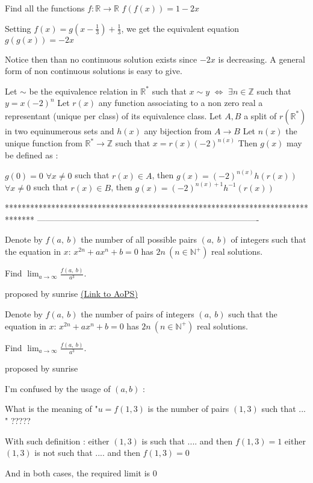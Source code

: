 \begin{solution}
	\begin{tcolorbox}Find all the functions $ f:\mathbb{R}\rightarrow\mathbb{R} $
$ f(f(x)) = 1-2x $\end{tcolorbox}
Setting $f(x)=g(x-\frac 13)+\frac 13$, we get the equivalent equation $g(g(x))=-2x$

Notice then than no continuous solution exists since $-2x$ is decreasing.
A general form of non continuous solutions is easy to give.

Let $\sim$ be the equivalence relation in $\mathbb R^*$ such that $x\sim y$ $\iff$ $\exists n\in\mathbb Z$ such that $y=x(-2)^n$
Let $r(x)$ any function associating to a non zero real a representant (unique per class) of its equivalence class.
Let $A,B$ a split of $r(\mathbb R^*)$ in two equinumerous sets and $h(x)$ any bijection from $A\to B$
Let $n(x)$ the unique function from $\mathbb R^*\to \mathbb Z$ such that $x=r(x)(-2)^{n(x)}$
Then $g(x)$ may be defined as :

$g(0)=0$
$\forall x\ne 0$ such that $r(x)\in A$, then $g(x)=(-2)^{n(x)}h(r(x))$
$\forall x\ne 0$ such that $r(x)\in B$, then $g(x)=(-2)^{n(x)+1}h^{-1}(r(x))$
\end{solution}
*******************************************************************************
-------------------------------------------------------------------------------

\begin{problem}
	Denote by $f(a,\ b)$ the number of all possible pairs $(a,\ b)$ of integers such that the equation in $x$: $x^{2n}+ax^n+b=0$ has $2n\ (n\in\mathbb{N^{+}})$ real solutions.

Find $\lim_{a\to\infty}\frac{f(a,\ b)}{a^3}.$

proposed by sunrise
	\flushright \href{https://artofproblemsolving.com/community/c6h469830}{(Link to AoPS)}
\end{problem}



\begin{solution}
	\begin{tcolorbox}Denote by $f(a,\ b)$ the number of pairs of integers $(a,\ b)$ such that the equation in $x$: $x^{2n}+ax^n+b=0$ has $2n\ (n\in\mathbb{N^{+}})$ real solutions.

Find $\lim_{a\to\infty}\frac{f(a,\ b)}{a^3}.$

proposed by sunrise\end{tcolorbox}
I'm confused by the usage of $(a,b)$  :

What is the meaning of "$u=f(1,3)$ is the number of pairs $(1,3)$ such that ... " ?????

With such definition :
 either $(1,3)$ is such that .... and then $f(1,3)=1$
 either $(1,3)$ is not such that .... and then $f(1,3)=0$

And in both cases, the required limit is $0$
\end{solution}



